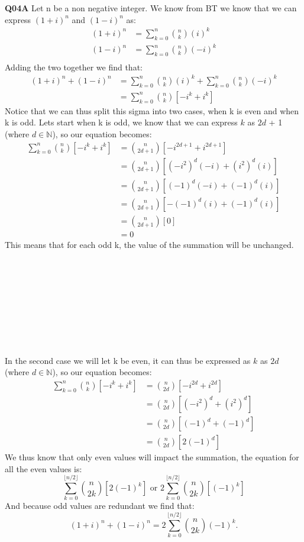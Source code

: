 \documentclass[11pt]{article}
\begin{document}
\parindent=0pt

\textbf{Q04A} Let n be a non negative integer. We know from BT we know that we can express $(1+i)^n$ and $(1-i)^n$ as:
\begin{align*}
 (1+i)^n & = \sum\limits_{k = 0}^n\binom{n}{k}(i)^k \\
 (1-i)^n & = \sum\limits_{k = 0}^n\binom{n}{k}(-i)^k \\
\end{align*}
Adding the two together we find that:
\begin{align*}
 (1+i)^n +  (1-i)^n & = \sum\limits_{k = 0}^n\binom{n}{k}(i)^k + \sum\limits_{k = 0}^n\binom{n}{k}(-i)^k\\
 & = \sum\limits_{k = 0}^n\binom{n}{k}[-i^k+i^k] 
\end{align*}
Notice that we can thus split this sigma into two cases, when k is even and when k is odd. Lets start when k is odd, we know that we can express $k$ as $2d$ + 1 (where $d \in \mathbb N$), so our equation becomes:
\begin{align*}
\sum\limits_{k = 0}^n\binom{n}{k}[-i^k+i^k] & = \binom{n}{2d+1}[-i^{2d+1}+i^{2d+1}]  \\
 & = \binom{n}{2d+1}[(-i^2)^d(-i) + (i^{2})^d(i)]  \\
 & = \binom{n}{2d+1}[(-1)^d(-i) + (-1)^d(i)]  \\
 & = \binom{n}{2d+1}[-(-1)^d(i) + (-1)^d(i)]  \\
 & = \binom{n}{2d+1}[0]  \\
 & = 0
\end{align*}
This means that for each odd k, the value of the summation will be unchanged. \\\\\\\\\\\\\\\\\\\\

In the second case we will let k be even, it can thus be expressed as  $k$ as $2d$ (where $d \in \mathbb N$), so our equation becomes:
\begin{align*}
\sum\limits_{k = 0}^n\binom{n}{k}[-i^k+i^k] & = \binom{n}{2d}[-i^{2d}+i^{2d}]  \\
 & = \binom{n}{2d}[(-i^2)^d + (i^{2})^d]  \\
 & = \binom{n}{2d}[(-1)^d + (-1)^d]  \\
 & = \binom{n}{2d}[2(-1)^d] 
\end{align*}
We thus know that only even values will impact the summation, the equation for all the even values is:
\[ \sum\limits_{k = 0}^{\lfloor n/2\rfloor} \binom{n}{2k}[2(-1)^k]  \text{ or }  2\sum\limits_{k = 0}^{\lfloor n/2\rfloor} \binom{n}{2k}[(-1)^k] \]
And because odd values are redundant we find that:
\[ (1 + i)^n + (1 - i)^n = 2\sum\limits_{k = 0}^{\lfloor n/2\rfloor} \binom{n}{2k}(-1)^k. \]
\end{document}
